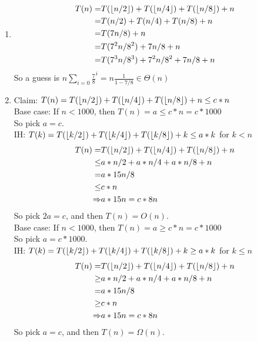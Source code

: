 \documentclass{assignment}
\DeclarePairedDelimiter\floor{\lfloor}{\rfloor}
\begin{document}
\begin{problemlist}

\pbitem
\begin{problem}
\end{problem}
\begin{answer}
\\
\begin{enumerate}
\item
\begin{align*}
T(n)=&T(\floor{n/2})+T(\floor{n/4})+T(\floor{n/8})+n\\
=&T(n/2)+T(n/4)+T(n/8)+n\\
=&T(7n/8)+n\\
=&T(7^2n/8^2)+7n/8+n\\
=&T(7^3n/8^3)+7^2n/8^2+7n/8+n\\
\end{align*}
So a guess is $n\sum_{i=0}\frac{7}{8}^i=n\frac{1}{1-7/8}\in \Theta (n)$\\
\item
Claim: $T(n)=T(\floor{n/2})+T(\floor{n/4})+T(\floor{n/8})+n\le c*n$\\
Base case: If $n<1000$, then $T(n)=a \le c*n=c*1000$\\
So pick $a=c$.\\
IH: $T(k)=T(\floor{k/2})+T(\floor{k/4})+T(\floor{k/8})+k\le a*k$ for $k < n$\\
\begin{align*}
T(n)=&T(\floor{n/2})+T(\floor{n/4})+T(\floor{n/8})+n\\
\le&a*n/2+a*n/4+a*n/8+n\\
=&a*15n/8\\
\le&c*n\\
\Rightarrow&a*15n=c*8n\\
\end{align*}
So pick $2a=c$, and then $T(n)=O(n)$.\\

Base case: If $n<1000$, then $T(n)=a \ge c*n=c*1000$\\
So pick $a=c*1000$.\\
IH: $T(k)=T(\floor{k/2})+T(\floor{k/4})+T(\floor{k/8})+k\ge a*k$ for $k\le n$\\
\begin{align*}
T(n)=&T(\floor{n/2})+T(\floor{n/4})+T(\floor{n/8})+n\\
\ge&a*n/2+a*n/4+a*n/8+n\\
=&a*15n/8\\
\ge&c*n\\
\Rightarrow&a*15n=c*8n\\
\end{align*}
So pick $a=c$, and then $T(n)=\Omega (n)$.\\


\end{enumerate}
\end{answer}
\end{problemlist}
\end{document}
